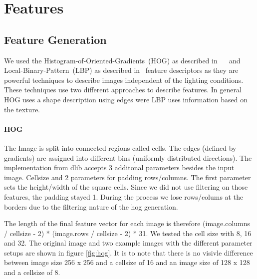 \documentclass[a4paper,10pt]{article}
\begin{document}
\section{Features}
\subsection{Feature Generation}

We used the Histogram-of-Oriented-Gradients~(HOG) as described in ~\cite{McC86}~\cite{DT05}
and Local-Binary-Pattern~(LBP) as described in~\cite{OPH94}
feature descriptors as they are powerful techniques to describe images independent of the lighting conditions.
These techniques use two different approaches to describe features. In general HOG uses a shape description using edges were LBP uses information based on the texture.

\paragraph{HOG} 
The Image is split into connected regions called cells. The edges (defined by gradients) are assigned into different bins (uniformly distributed directions).
The implementation from dlib accepts 3 additonal parameters besides the input image.
Cellsize and 2 parameters for padding rows/columns. The first parameter sets the height/width of the square cells. 
Since we did not use filtering on those features, the padding stayed 1. During the process we lose rows/colums at the borders due to the filtering nature of the hog generation.

The length of the final feature vector for each image is therefore (image.columns / cellsize - 2)  * (image.rows / cellsize - 2) * 31.
We tested the cell size with 8, 16 and 32.
The original image and two example images with the different parameter setups are shown in figure \ref{fig:hog}.
It is to note that there is no visivle difference between image size 256 x 256 and a cellsize of 16 and an image size of 128 x 128 and a cellsize of 8.
\end{document}
